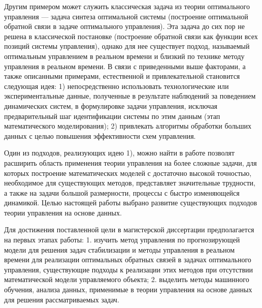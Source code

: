 Другим примером может служить классическая задача из теории оптимального управления --- задача синтеза оптимальной системы \cite{npont} (построение оптимальной обратной связи в задаче оптимального управления). Эта задача до сих пор не решена в классической постановке (построение обратной связи как функции всех позиций системы управления), однако для нее существует подход, называемый оптимальным управлением в реальном времени \cite{ngab} и близкий по технике методу управления в реальном времени. В связи с приведенными выше факторами, а также описанными примерами, естественной и привлекательной становится следующая идея: 1) непосредственно использовать технологические или экспериментальные данные, полученные в результате наблюдений за поведением динамических систем, в формулировке задачи управления, исключая предварительный шаг идентификации системы по этим данным (этап математического моделирования); 2) привлекать алгоритмы обработки больших данных с целью повышения эффективности схем управления. 

Один из подходов, реализующих идею 1), можно найти в работе  позволят расширить область применения теории управления на более сложные задачи, для которых построение математических моделей с достаточно высокой точностью, необходимое для существующих методов, представляет значительные трудности, а также на задачи большой размерности, процессы с быстро изменяющейся динамикой. Целью настоящей работы выбрано развитие существующих подходов теории управления на основе данных. 


Для достижения поставленной цели в магистерской диссертации предполагается на первых этапах работы:  1. изучить метод управления по прогнозирующей модели для решения задач стабилизации и методы управления в реальном времени для реализации оптимальных обратных связей в задачах оптимального управления, существующие подходы к реализации этих методов при отсутствии математической модели управляемого объекта; 2. выделить методы машинного обучения, анализа данных, применимые в теории управления на основе данных для решения рассматриваемых задач.